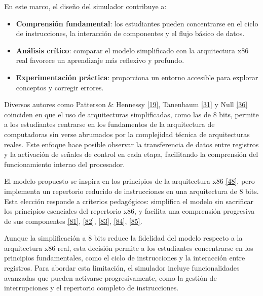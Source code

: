 \documentclass[12pt,oneside]{templates/unerthesis}
\providecommand{\tightlist}{%
  \setlength{\itemsep}{0pt}\setlength{\parskip}{0pt}}
\begin{document}
En este marco, el diseño del simulador contribuye a:

\begin{itemize}
\tightlist
\item
  \textbf{Comprensión fundamental}: los estudiantes pueden concentrarse en el ciclo de instrucciones, la interacción de componentes y el flujo básico de datos.\\
\item
  \textbf{Análisis crítico}: comparar el modelo simplificado con la arquitectura x86 real favorece un aprendizaje más reflexivo y profundo.\\
\item
  \textbf{Experimentación práctica}: proporciona un entorno accesible para explorar conceptos y corregir errores.
\end{itemize}

Diversos autores como Patterson \& Hennessy \protect\hyperlink{ref-hennessy2017computer}{{[}19{]}}, Tanenbaum \protect\hyperlink{ref-tanenbaum_structured_2016}{{[}31{]}} y Null \protect\hyperlink{ref-null_essentials_2023}{{[}36{]}} coinciden en que el uso de arquitecturas simplificadas, como las de 8 bits, permite a los estudiantes centrarse en los fundamentos de la arquitectura de computadoras sin verse abrumados por la complejidad técnica de arquitecturas reales. Este enfoque hace posible observar la transferencia de datos entre registros y la activación de señales de control en cada etapa, facilitando la comprensión del funcionamiento interno del procesador.

El modelo propuesto se inspira en los principios de la arquitectura x86 \protect\hyperlink{ref-intel_microarchitecture_2021}{{[}48{]}}, pero implementa un repertorio reducido de instrucciones en una arquitectura de 8 bits. Esta elección responde a criterios pedagógicos: simplifica el modelo sin sacrificar los principios esenciales del repertorio x86, y facilita una comprensión progresiva de sus componentes \protect\hyperlink{ref-patt2019introduction}{{[}81{]}}, \protect\hyperlink{ref-majid1999design}{{[}82{]}}, \protect\hyperlink{ref-morlan_sap1_2021}{{[}83{]}}, \protect\hyperlink{ref-Guald_2015_thesis}{{[}84{]}}, \protect\hyperlink{ref-silber_tinycpu}{{[}85{]}}.

Aunque la simplificación a 8 bits reduce la fidelidad del modelo respecto a la arquitectura x86 real, esta decisión permite a los estudiantes concentrarse en los principios fundamentales, como el ciclo de instrucciones y la interacción entre registros. Para abordar esta limitación, el simulador incluye funcionalidades avanzadas que pueden activarse progresivamente, como la gestión de interrupciones y el repertorio completo de instrucciones.
\end{document}
